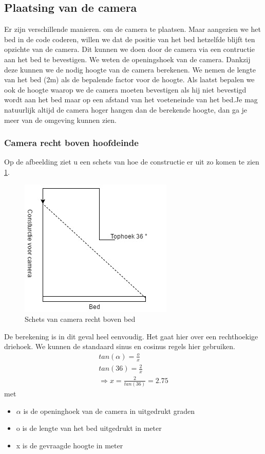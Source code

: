 \subsection {Plaatsing van de camera}
\label{mRefSTP}
Er zijn verschillende manieren. om de camera te plaatsen. Maar aangezien we het bed in de code coderen, willen we dat de positie van het bed hetzelfde blijft ten opzichte van de camera. Dit kunnen we doen door de camera via een contructie aan het bed te bevestigen. We weten de openingshoek van de camera. Dankzij deze kunnen we de nodig hoogte van de camera berekenen. We nemen de lengte van het bed (2m) als de bepalende factor voor de hoogte. Als laatst bepalen we ook de hoogte waarop we de camera moeten bevestigen als hij niet bevestigd wordt aan het bed maar op een afstand van het voeteneinde van het bed.Je mag natuurlijk altijd de camera hoger hangen dan de berekende hoogte, dan ga je meer van de omgeving kunnen zien. 

\subsubsection{Camera recht boven hoofdeinde}
Op de afbeelding ziet u een schets van hoe de constructie er uit zo komen te zien \ref{imgCBB}.
\begin{figure}[h]
	\includegraphics[scale=0.75]{CamBovenBed}
	\caption{Schets van camera recht boven bed}
	\label{imgCBB}
\end{figure}
De berekening is in dit geval heel eenvoudig. Het gaat hier over een rechthoekige driehoek. We kunnen de standaard sinus en cosinus regels hier gebruiken.
\begin{gather}
tan(\alpha) =\frac{o}{x}\\
tan(36) = \frac{2}{x} \\
\Rightarrow x = \frac{2}{tan(36)} = 2.75
\end{gather}
met
\begin{itemize}
	\item $\alpha$ is de openinghoek van de camera in uitgedrukt graden
	\item o is de lengte van het bed uitgedrukt in meter
	\item x is de gevraagde hoogte in meter
\end{itemize}

